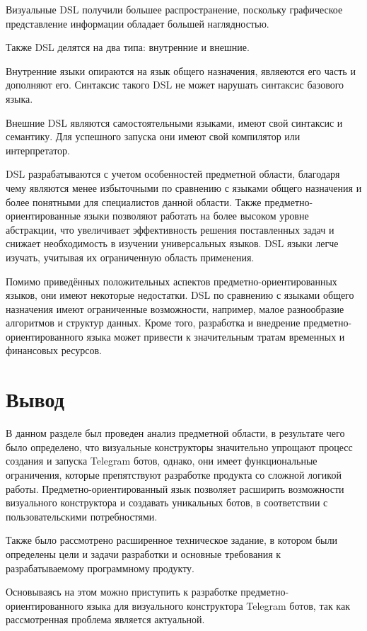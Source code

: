 Визуальные DSL получили большее распространение, поскольку графическое представление информации обладает большей наглядностью.

Также DSL делятся на два типа: внутренние и внешние.

Внутренние языки опираются на язык общего назначения, являеются его часть и дополняют его.
Синтаксис такого DSL не может нарушать синтаксис базового языка.

Внешние DSL являются самостоятельными языками, имеют свой синтаксис и семантику.
Для успешного запуска они имеют свой компилятор или интерпретатор.

DSL разрабатываются с учетом особенностей предметной области,
благодаря чему являются менее избыточными по сравнению с языками общего назначения и более понятными для специалистов данной области.
Также предметно-ориентированные языки позволяют работать на более высоком уровне абстракции,
что увеличивает эффективность решения поставленных задач и снижает необходимость в изучении универсальных языков.
DSL языки легче изучать, учитывая их ограниченную область применения.

Помимо приведённых положительных аспектов предметно-ориентированных языков, они имеют некоторые недостатки.
DSL по сравнению с языками общего назначения имеют ограниченные возможности, например, малое разнообразие алгоритмов и структур данных.
Кроме того, разработка и внедрение предметно-ориентированного языка может привести к значительным тратам временных и финансовых ресурсов.



\section*{Вывод}

В данном разделе был проведен анализ предметной области, в результате чего было определено,
что визуальные конструкторы значительно упрощают процесс создания и запуска Telegram ботов,
однако, они имеет функциональные ограничения, которые препятствуют разработке продукта со сложной логикой работы.
Предметно-ориентированный язык позволяет расширить возможности визуального конструктора и создавать уникальных ботов,
в соответствии с пользовательскими потребностями.

Также было рассмотрено расширенное техническое задание,
в котором были определены цели и задачи разработки и основные требования к разрабатываемому программному продукту.

Основываясь на этом можно приступить к разработке предметно-ориентированного языка для визуального конструктора Telegram ботов,
так как рассмотренная проблема является актуальной.